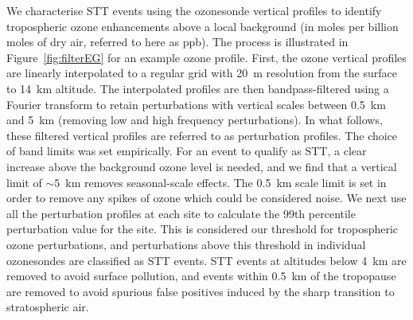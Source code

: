 \documentclass{article}
\begin{document}
    We characterise STT events using the ozonesonde vertical profiles to identify tropospheric ozone enhancements above a local background (in moles per billion moles of dry air, referred to here as ppb).
    The process is illustrated in Figure~\ref{fig:filterEG} for an example ozone profile.
    First, the ozone vertical profiles are linearly interpolated to a regular grid with 20~m resolution from the surface to 14~km altitude. 
    The interpolated profiles are then bandpass-filtered using a Fourier transform to retain perturbations with vertical scales between 0.5~km and 5~km (removing low and high frequency perturbations).
    In what follows, these filtered vertical profiles are referred to as perturbation profiles.
    The choice of band limits was set empirically. 
    For an event to qualify as STT, a clear increase above the background ozone level is needed, and we find that a vertical limit of $\sim5$~km removes seasonal-scale effects.
    The 0.5~km scale limit is set in order to remove any spikes of ozone which could be considered noise.
    We next use all the perturbation profiles at each site to calculate the 99th percentile perturbation value for the site.
    This is considered our threshold for tropospheric ozone perturbations, and perturbations above this threshold in individual ozonesondes are classified as STT events.
    STT events at altitudes below 4~km are removed to avoid surface pollution, and events within 0.5~km of the tropopause are removed to avoid spurious false positives induced by the sharp transition to stratospheric air.
    
\end{document}
